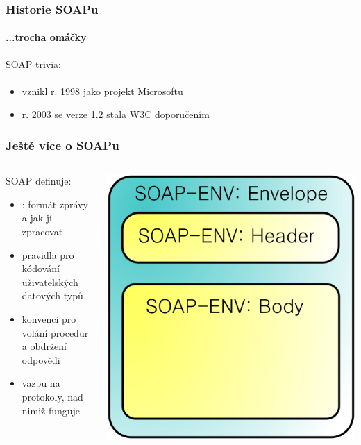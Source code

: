 \documentclass[12pt]{beamer}
\begin{document}
\begin{frame}
  \frametitle{Historie SOAPu}
  \framesubtitle{...trocha omáčky}

  \begin{block}{SOAP trivia:}
    \begin{itemize}
      \item vznikl r. 1998 jako projekt Microsoftu\textsuperscript{\texttrademark \textsuperscript{\textregistered}}
      \item r. 2003 se verze 1.2 stala W3C doporučením
    \end{itemize}
  \end{block}
\end{frame}

\begin{frame}
  \frametitle{Ještě více o SOAPu}

  \begin{columns}[c]
      \begin{block}{SOAP definuje:}
        \begin{itemize}
          \item {}: formát zprávy a jak jí zpracovat
          \item pravidla pro kódování uživatelských datových typů
          \item konvenci pro volání procedur a obdržení odpovědi
          \item vazbu na protokoly, nad nimiž funguje
        \end{itemize}
      \end{block}
      \includegraphics[width=\textwidth,keepaspectratio=true]{soap-envelope.png}
  \end{columns}
\end{frame}
\end{document}
